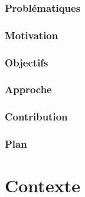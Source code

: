 \documentclass{EPL-master-thesis-covers-FR}
\begin{document}
			

		\subsection*{Problématiques}
		


		\subsection*{Motivation}

			

		\subsection*{Objectifs}

			
		\subsection*{Approche}

			
		\subsection*{Contribution}


		\subsection*{Plan}


	\chapter{Contexte}
\end{document}
